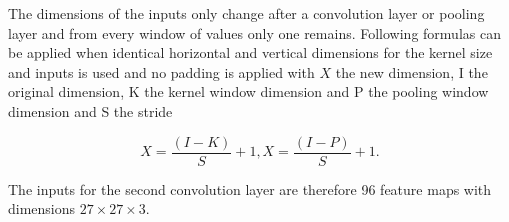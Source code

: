 \documentclass[a4paper,10pt]{article}
\begin{document}
The dimensions of the inputs only change after a convolution layer or pooling layer and from every window of values only one remains. Following formulas can be applied when identical horizontal and vertical dimensions for the kernel size and inputs is used and no padding is applied with $ X $ the new dimension, I the original dimension, K the kernel window dimension and P the pooling window dimension and S the stride 

\begin{subequations}
	\begin{equation}
		X = \frac{(I-K)}{S} + 1,
	\end{equation} 
	\begin{equation}
			X = \frac{(I-P)}{S} + 1.
	\end{equation}   
\end{subequations}

The inputs for the second convolution layer are therefore 96 feature maps with dimensions $ 27 \times 27 \times 3 $.












%
\end{document}
